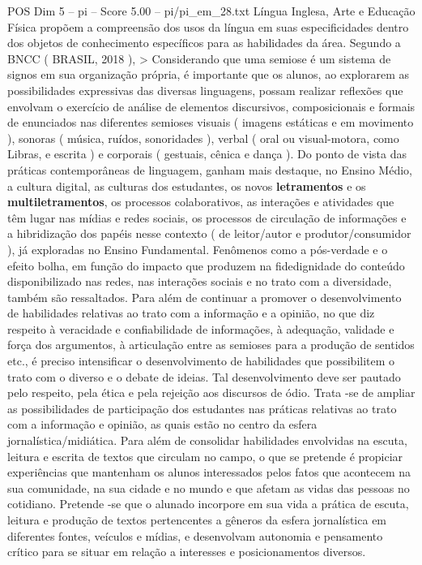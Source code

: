 \begin{textsample}{POS Dim 5 – pi – Score 5.00 – pi/pi\_em\_28.txt}
Língua Inglesa, Arte e Educação Física propõem a compreensão dos usos da língua em suas especificidades dentro dos objetos de conhecimento específicos para as habilidades da área.
Segundo a BNCC ( BRASIL, 2018 ), > Considerando que uma semiose é um sistema de signos em sua organização própria, é importante que os alunos, ao explorarem as possibilidades expressivas das diversas linguagens, possam realizar reflexões que envolvam o exercício de análise de elementos discursivos, composicionais e formais de enunciados nas diferentes semioses visuais ( imagens estáticas e em movimento ), sonoras ( música, ruídos, sonoridades ), verbal ( oral ou visual-motora, como Libras, e escrita ) e corporais ( gestuais, cênica e dança ).
Do ponto de vista das práticas contemporâneas de linguagem, ganham mais destaque, no Ensino Médio, a cultura digital, as culturas dos estudantes, os novos \textbf{letramentos} e os \textbf{multiletramentos}, os processos colaborativos, as interações e atividades que têm lugar nas mídias e redes sociais, os processos de circulação de informações e a hibridização dos papéis nesse contexto ( de leitor/autor e produtor/consumidor ), já exploradas no Ensino Fundamental.
Fenômenos como a pós-verdade e o efeito bolha, em função do impacto que produzem na fidedignidade do conteúdo disponibilizado nas redes, nas interações sociais e no trato com a diversidade, também são ressaltados.
Para além de continuar a promover o desenvolvimento de habilidades relativas ao trato com a informação e a opinião, no que diz respeito à veracidade e confiabilidade de informações, à adequação, validade e força dos argumentos, à articulação entre as semioses para a produção de sentidos etc., é preciso intensificar o desenvolvimento de habilidades que possibilitem o trato com o diverso e o debate de ideias.
Tal desenvolvimento deve ser pautado pelo respeito, pela ética e pela rejeição aos discursos de ódio.
Trata -se de ampliar as possibilidades de participação dos estudantes nas práticas relativas ao trato com a informação e opinião, as quais estão no centro da esfera jornalística/midiática.
Para além de consolidar habilidades envolvidas na escuta, leitura e escrita de textos que circulam no campo, o que se pretende é propiciar experiências que mantenham os alunos interessados pelos fatos que acontecem na sua comunidade, na sua cidade e no mundo e que afetam as vidas das pessoas no cotidiano.
Pretende -se que o alunado incorpore em sua vida a prática de escuta, leitura e produção de textos pertencentes a gêneros da esfera jornalística em diferentes fontes, veículos e mídias, e desenvolvam autonomia e pensamento crítico para se situar em relação a interesses e posicionamentos diversos.

\end{textsample}
